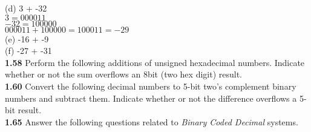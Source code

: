 \documentclass[12pt,a4paper]{report}
\begin{document}
\begin{normalsize}
(d) 3 + -32 \\
$ 3 = 000011 $ \\
$ -32 = 100000 $ \\
$ 000011 + 100000 = 100011 = -29 $ \\

(e) -16 + -9 \\
$ $ \\
$ $ \\

(f) -27 + -31 \\
$ $ \\
$ $ \\

\textbf{1.58} Perform the following additions of unsigned hexadecimal numbers. Indicate whether or not the sum overflows an 8bit (two hex digit) result. \\

\textbf{1.60} Convert the following decimal numbers to 5-bit two's complement binary numbers and subtract them. Indicate whether or not the difference overflows a 5-bit result. \\

\textbf{1.65} Answer the following questions related to \textit{Binary Coded Decimal} systems. \\





\end{normalsize}
\end{document}
